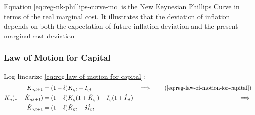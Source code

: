 \documentclass[../thesis.tex]{subfiles}
\begin{document}
Equation \ref{eq:reg-nk-phillips-curve-mc} is the New Keynesian Phillips Curve in terms of the real marginal cost. It illustrates that the deviation of inflation depends on both the expectation of future inflation deviation and the present marginal cost deviation.


\subsubsection*{Law of Motion for Capital}

Log-linearize \ref{eq:reg-law-of-motion-for-capital}:
	\begin{alignat}{2}
		K_{\eta, t+1} &= (1-\delta)K_{\eta t} + I_{\eta t} &\implies \tag{\ref{eq:reg-law-of-motion-for-capital}} \\
		K_{\eta} (1 + \hat{K}_{\eta, t+1}) &= (1-\delta) K_{\eta} (1 + \hat{K}_{\eta t}) + I_{\eta} (1 + \hat{I}_{\eta t}) &\implies \nonumber \\
		\hat{K}_{\eta, t+1} &= (1-\delta) \hat{K}_{\eta t} + \delta \hat{I}_{\eta t} \label{eq:reg-ll-law-of-motion-for-capital}
	\end{alignat}

\end{document}
